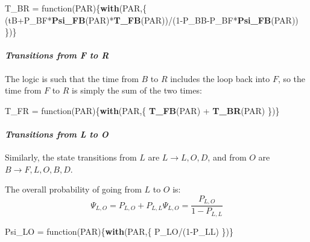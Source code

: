 \documentclass[]{article}
\newenvironment{Shaded}{\begin{snugshade}}{\end{snugshade}}
\newcommand{\KeywordTok}[1]{\textcolor[rgb]{0.13,0.29,0.53}{\textbf{{#1}}}}
\newcommand{\DecValTok}[1]{\textcolor[rgb]{0.00,0.00,0.81}{{#1}}}
\newcommand{\StringTok}[1]{\textcolor[rgb]{0.31,0.60,0.02}{{#1}}}
\newcommand{\NormalTok}[1]{{#1}}
\let\oldparagraph\paragraph
\renewcommand{\paragraph}[1]{\oldparagraph{#1}\mbox{}}
\begin{document}
\begin{Shaded}
\begin{Highlighting}[]
\NormalTok{T_BR =}\StringTok{ }\NormalTok{function(PAR)\{}\KeywordTok{with}\NormalTok{(PAR,\{}
  \NormalTok{(tB+P_BF*}\KeywordTok{Psi_FB}\NormalTok{(PAR)*}\KeywordTok{T_FB}\NormalTok{(PAR))/(}\DecValTok{1}\NormalTok{-P_BB-P_BF*}\KeywordTok{Psi_FB}\NormalTok{(PAR))}
\NormalTok{\})\}}
\end{Highlighting}
\end{Shaded}

\paragraph{\texorpdfstring{\emph{Transitions from F to
R}}{Transitions from F to R}}\label{transitions-from-f-to-r}

The logic is such that the time from \(B\) to \(R\) includes the loop
back into \(F\), so the time from \(F\) to \(R\) is simply the sum of
the two times:

\begin{Shaded}
\begin{Highlighting}[]
\NormalTok{T_FR =}\StringTok{ }\NormalTok{function(PAR)\{}\KeywordTok{with}\NormalTok{(PAR,\{}
  \KeywordTok{T_FB}\NormalTok{(PAR) +}\StringTok{ }\KeywordTok{T_BR}\NormalTok{(PAR)}
\NormalTok{\})\}}
\end{Highlighting}
\end{Shaded}

\paragraph{\texorpdfstring{\emph{Transitions from L to
O}}{Transitions from L to O}}\label{transitions-from-l-to-o}

Similarly, the state transitions from \(L\) are
\(L \rightarrow {L,O,D}\), and from \(O\) are
\(B\rightarrow {F,L,O,B,D}\).

The overall probability of going from \(L\) to \(O\) is: \[
\Psi_{L,O}= P_{L,O} + P_{L,L} \Psi_{L,O} = \frac{P_{L,O}}{1-P_{L,L}}
\]

\begin{Shaded}
\begin{Highlighting}[]
\NormalTok{Psi_LO =}\StringTok{ }\NormalTok{function(PAR)\{}\KeywordTok{with}\NormalTok{(PAR,\{}
  \NormalTok{P_LO/(}\DecValTok{1}\NormalTok{-P_LL)}
\NormalTok{\})\}}
\end{Highlighting}
\end{Shaded}
\end{document}
